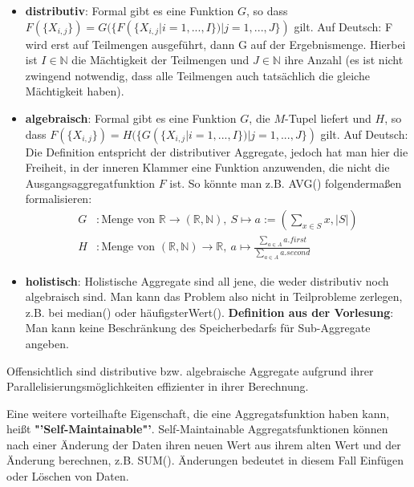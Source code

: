 \begin{itemize}
	\item \textbf{distributiv}: Formal gibt es eine Funktion \(G\), so dass \(F(\{X_{i,j}\}) = G(\{F(\{X_{i,j}| i = 1, ..., I\}) | j = 1, ..., J\})\) gilt. Auf Deutsch: F wird erst auf Teilmengen ausgeführt, dann G auf der Ergebnismenge. Hierbei ist \(I \in \mathbb{N}\) die Mächtigkeit der Teilmengen und \(J\in\mathbb{N}\) ihre Anzahl (es ist nicht zwingend notwendig, dass alle Teilmengen auch tatsächlich die gleiche Mächtigkeit haben).
	\item \textbf{algebraisch}: Formal gibt es eine Funktion \(G\), die \(M\)-Tupel liefert und \(H\), so dass \(F(\{X_{i,j}\}) = H(\{G(\{X_{i,j}| i = 1, ..., I\}) | j = 1, ..., J\})\) gilt. Auf Deutsch: Die Definition entspricht der distributiver Aggregate, jedoch hat man hier die Freiheit, in der inneren Klammer eine Funktion anzuwenden, die nicht die Ausgangsaggregatfunktion \(F\) ist. So könnte man z.B. AVG() folgendermaßen formalisieren:
	\begin{align*}
		G &: \text{Menge von } \mathbb{R} \rightarrow (\mathbb{R},\mathbb{N}),\ S \mapsto a:= (\sum_{x\in S} x, |S|) \\
		H &: \text{Menge von } (\mathbb{R},\mathbb{N}) \rightarrow \mathbb{R},\ a \mapsto \frac{\sum\nolimits_{a\in A} a.first}{\sum\nolimits_{a\in A}a.second}
	\end{align*}
	\item \textbf{holistisch}: Holistische Aggregate sind all jene, die weder distributiv noch algebraisch sind. Man kann das Problem also nicht in Teilprobleme zerlegen, z.B. bei median() oder häufigsterWert(). \textbf{Definition aus der Vorlesung}: Man kann keine Beschränkung des Speicherbedarfs für Sub-Aggregate angeben.
\end{itemize}
Offensichtlich sind distributive bzw. algebraische Aggregate aufgrund ihrer Parallelisierungsmöglichkeiten effizienter in ihrer Berechnung.

\noindent Eine weitere vorteilhafte Eigenschaft, die eine Aggregatsfunktion haben kann, heißt \textbf{"'Self-Maintainable"'}. Self-Maintainable Aggregatsfunktionen können nach einer Änderung der Daten ihren neuen Wert aus ihrem alten Wert und der Änderung berechnen, z.B. SUM(). Änderungen bedeutet in diesem Fall Einfügen oder Löschen von Daten.

